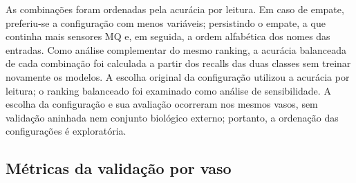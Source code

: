 
As combinações foram ordenadas pela acurácia por leitura. Em caso de
empate, preferiu-se a configuração com menos variáveis; persistindo
o empate, a que continha mais sensores MQ e, em seguida, a ordem
alfabética dos nomes das entradas. Como análise complementar do mesmo
ranking, a acurácia balanceada de cada combinação foi calculada a partir
dos recalls das duas classes
sem treinar novamente os modelos. A escolha original da configuração
utilizou a acurácia por leitura; o ranking balanceado foi examinado como
análise de sensibilidade. A escolha da configuração
e sua avaliação ocorreram nos mesmos vasos, sem validação aninhada
nem conjunto biológico externo; portanto, a ordenação das
configurações é exploratória.

\subsection{Métricas da validação por vaso}
\label{subsec:metricas_loso_complementar}

